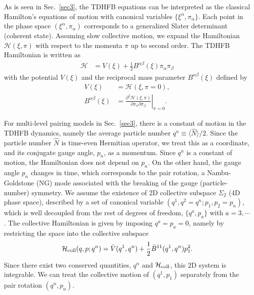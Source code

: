 \documentclass[%
superscriptaddress,
showpacs,
nofootinbib,
amsmath,amssymb,
aps,
prc,
twocolumn,
floatfix ]%
{revtex4-1}
\begin{document}
As is seen in Sec.~\ref{sec3}, the TDHFB equations can be
interpreted as the classical Hamilton's equations of motion
with canonical variables $\{\xi^{\alpha},\pi_{\alpha}\}$. 
Each point in the phase space $(\xi^{\alpha},\pi_{\alpha})$
corresponds to a generalized Slater determinant (coherent state).
Assuming slow collective motion,
we expand the Hamiltonian $\mathcal{H}(\xi,\pi)$ with respect to
the momenta $\pi$ up to second order.
The TDHFB Hamiltonian is written as
\begin{align}
 \mathcal{H} &= V(\xi) + \frac{1}{2}B^{\alpha\beta}(\xi)\pi_{\alpha}\pi_{\beta}
\end{align}
with the potential $V(\xi)$ and
the reciprocal mass parameter $B^{\alpha\beta}(\xi)$ defined by
\begin{align}
  V(\xi) &= \mathcal{H}(\xi,\pi=0) , \\
  B^{\alpha\beta}(\xi) &= \left. \frac{\partial^2\mathcal{H}(\xi,\pi)}{\partial\pi_{\alpha}\partial\pi_{\beta}} \right|_{\pi=0}.
\end{align}

For multi-level pairing models in Sec.~\ref{sec3}, 
there is a constant of motion in the TDHFB dynamics,
namely the average particle number $q^n\equiv \langle \hat{N} \rangle/2$.
Since the particle number $\hat{N}$ is time-even Hermitian operator, we treat
this as a coordinate, and its conjugate gauge angle, $p_n$,
as a momentum.
Since $q^n$ is a constant of motion, the Hamiltonian does not
depend on $p_n$.
On the other hand, the gauge angle $p_n$ changes in time,
which corresponds to the pair rotation, a Nambu-Goldstone (NG) mode
associated with the breaking of the gauge (particle-number) symmetry.
We assume the existence of 2D collective subspace $\Sigma_2$
(4D phase space),
described by a set of canonical variable $(q^1,q^2=q^n;p_1,p_2=p_n)$,
which is well decoupled from the rest of degrees of freedom,
$\{q^a,p_a\}$ with $a=3,\cdots$.
The collective Hamiltonian is given by imposing $q^a=p_a=0$,
namely by restricting the space into the collective subspace
\begin{equation}
\mathcal{H}_{\rm coll}(q,p;q^n)
= \bar{V}(q^1,q^n) + \frac{1}{2}\bar{B}^{11}(q^1,q^n)p_1^2 .
  \label{coll}
\end{equation}
Since there exist two conserved quantities, $q^n$ and $\mathcal{H}_{\rm coll}$,
this 2D system is integrable.
We can treat the collective motion of $(q^1,p_1)$ separately from
the pair rotation $(q^n, p_n)$.
\end{document}
